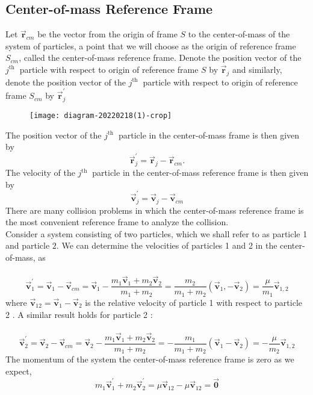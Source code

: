 \subsection{ Center-of-mass Reference Frame}
Let $\overrightarrow{\mathbf{r}}_{c m}$ be the vector from the origin of frame $S$ to the center-of-mass of the system of particles, a point that we will choose as the origin of reference frame $S_{c m}$, called the center-of-mass reference frame. Denote the position vector of the $j^{\text {th }}$ particle with respect to origin of reference frame $S$ by $\overrightarrow{\mathbf{r}}_{j}$ and similarly, denote the position vector of the $j^{\text {th }}$ particle with respect to origin of reference frame $S_{c m}$ by $\overrightarrow{\mathbf{r}}_{j}^{\prime}$ \\
\begin{figure}[H]
	\centering
	\texttt{[image: diagram-20220218(1)-crop]}
	\caption{}
	\label{}
\end{figure}
The position vector of the $j^{\text {th }}$ particle in the center-of-mass frame is then given by
$$
\overrightarrow{\mathbf{r}}_{j}^{\prime}=\overrightarrow{\mathbf{r}}_{j}-\overrightarrow{\mathbf{r}}_{c m} .
$$
The velocity of the $j^{\text {th }}$ particle in the center-of-mass reference frame is then given by
$$
\overrightarrow{\mathbf{v}}_{j}^{\prime}=\overrightarrow{\mathbf{v}}_{j}-\overrightarrow{\mathbf{v}}_{c m}
$$
There are many collision problems in which the center-of-mass reference frame is the most convenient reference frame to analyze the collision.\\
Consider a system consisting of two particles, which we shall refer to as particle 1 and particle $2 .$ We can determine the velocities of particles 1 and 2 in the center-of-mass,
as\\\\
$$\overrightarrow{\mathbf{v}}_{1}^{\prime}=\overrightarrow{\mathbf{v}}_{1}-\overrightarrow{\mathbf{v}}_{c m}=\overrightarrow{\mathbf{v}}_{1}-\frac{m_{1} \overrightarrow{\mathbf{v}}_{1}+m_{2} \overrightarrow{\mathbf{v}}_{2}}{m_{1}+m_{2}}=\frac{m_{2}}{m_{1}+m_{2}}\left(\overrightarrow{\mathbf{v}}_{1},-\overrightarrow{\mathbf{v}}_{2}\right)=\frac{\mu}{m_{1}} \overrightarrow{\mathbf{v}}_{1,2}$$
where $\overrightarrow{\mathbf{v}}_{12}=\overrightarrow{\mathbf{v}}_{1}-\overrightarrow{\mathbf{v}}_{2}$ is the relative velocity of particle 1 with respect to particle 2 . A similar result holds for particle 2 :\\\\
$$\overrightarrow{\mathbf{v}}_{2}^{\prime}=\overrightarrow{\mathbf{v}}_{2}-\overrightarrow{\mathbf{v}}_{c m}=\overrightarrow{\mathbf{v}}_{2}-\frac{m_{1} \overrightarrow{\mathbf{v}}_{1}+m_{2} \overrightarrow{\mathbf{v}}_{2}}{m_{1}+m_{2}}=-\frac{m_{1}}{m_{1}+m_{2}}\left(\overrightarrow{\mathbf{v}}_{1}-\overrightarrow{\mathbf{v}}_{2}\right)=-\frac{\mu}{m_{2}} \overrightarrow{\mathbf{v}}_{1,2}$$
The momentum of the system the center-of-mass reference frame is zero as we expect,
$$
m_{1} \overrightarrow{\mathbf{v}}_{1}^{\prime}+m_{2} \overrightarrow{\mathbf{v}}_{2}^{\prime}=\mu \overrightarrow{\mathbf{v}}_{12}-\mu \overrightarrow{\mathbf{v}}_{12}=\overrightarrow{\mathbf{0}}
$$

